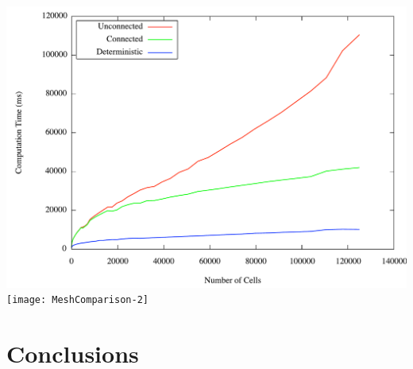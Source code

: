 \documentclass[color={usenames, dvipsnames},ignorenonframetext]{beamer}
\begin{document}
\begin{frame}
    \includegraphics[width=\textwidth, keepaspectratio]{MeshComparison}
    \texttt{[image: MeshComparison-2]}
\end{frame}
\section{Conclusions}
\end{document}
